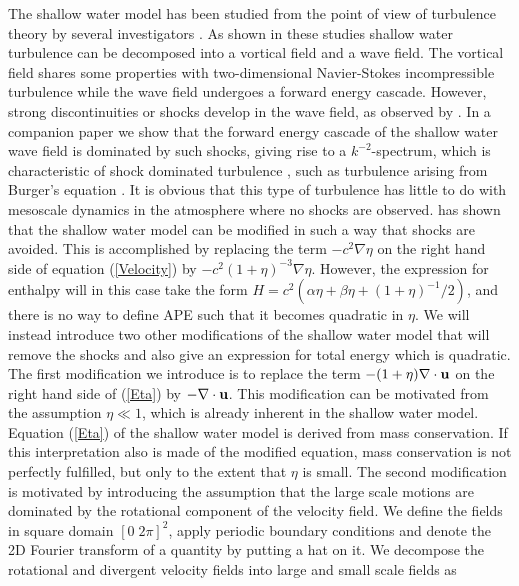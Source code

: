 The shallow water model has been studied from the point of view of turbulence theory by several investigators \citep{FargeSadourny1989, YuanHamilton1994, Dritschel2001}.
As shown in these studies shallow water turbulence can be decomposed into a vortical field and a wave field. The vortical field shares some properties with two-dimensional Navier-Stokes incompressible turbulence while the  wave field undergoes a forward energy cascade. However, strong discontinuities or shocks develop in the wave field, as observed by \citet{SpallMcWilliams1992}.
In a companion paper \citep{AugierMohananLindborg2017} we show that the forward energy cascade of the shallow water wave field is dominated by such shocks,
giving rise to a $ k^{-2} $-spectrum, which is  characteristic of shock dominated turbulence \citep{Kuznetsov2004}, such as turbulence arising from Burger's equation  \citep{BouchaudMezardParisi1995}.  It is obvious that this type of turbulence has little to do with mesoscale dynamics in the atmosphere where no shocks are observed. \citet{Buhler1998} has shown that the shallow water model can be modified in such a way that shocks are avoided. This is accomplished by replacing the term  $ -c^{2} \nabla \eta $ on the right hand side of equation (\ref{Velocity}) by  $ -c^{2}(1+\eta)^{-3} \nabla \eta $. However, the  expression for enthalpy will in this case take the form $ H = c^2( \alpha \eta + \beta \eta+ (1+\eta)^{-1}/2) $, and there is no way to define APE such that it becomes quadratic in $ \eta $.
We will instead introduce two other modifications of the shallow water model that will remove the shocks and also give an expression for total energy which is quadratic. The first modification we introduce is to replace the term
$ -(1+\eta) \nabla \cdot  {\bf u} $ on the right hand side of (\ref{Eta}) by $ -\nabla \cdot {\bf u} $. This modification can be motivated from the assumption $ \eta \ll 1 $, which is already inherent in the shallow water model.
{ Equation (\ref{Eta}) of the shallow water model is derived from mass conservation. If this interpretation also is made of the modified equation,  mass conservation is not perfectly fulfilled, but only to the extent that $ \eta $ is small.}  The second modification is motivated by introducing the assumption that the large scale motions are dominated by the rotational component of the velocity field.  We define the fields in square domain $
[0 \; 2\pi]^2 $, apply periodic boundary conditions and denote the 2D Fourier transform of a quantity by putting a hat on it. We decompose the rotational and divergent velocity fields into large and small scale fields as
